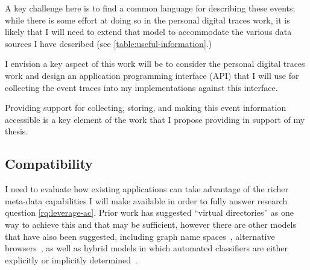 A key challenge here is to find a common language for describing these events;
while there is some effort at doing so in the personal digital traces work, it
is likely that I will need to extend that model to accommodate the various data
sources I have described (see \autoref{table:useful-information}.)


I envision a key aspect of this work will be to consider the personal digital
traces work and design an application programming interface (API) that I will
use for collecting the event traces into my implementations against this
interface.

Providing support for collecting, storing, and making this event information
accessible is a key element of the work that I propose providing in support of
my thesis.

\subsection{Compatibility}

I need to evaluate how existing applications can take advantage of the richer
meta-data capabilities I will make available in order to fully answer research
question \ref{rq:leverage-ac}.
Prior work has suggested ``virtual
directories'' as one way to achieve this and that may be sufficient, however
there are other models that have also been suggested, including graph name
spaces~\cite{gfs}, alternative browsers~\cite{9502515,collins2010escaping},
as well as hybrid models in which automated classifiers are either explicitly or
implicitly determined~\cite{10.1145/3209900.3209911}.


